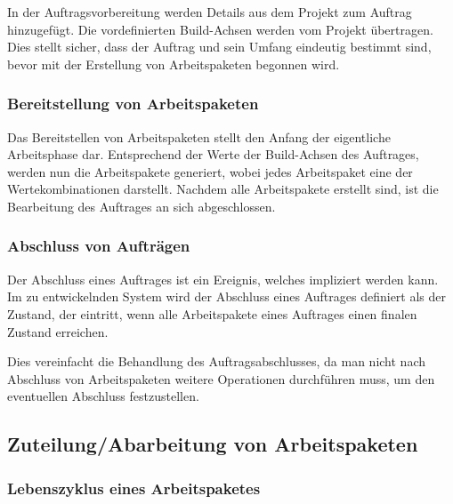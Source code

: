 In der Auftragsvorbereitung werden Details aus dem Projekt zum Auftrag hinzugefügt.
Die vordefinierten Build-Achsen werden vom Projekt übertragen.
Dies stellt sicher, dass der Auftrag und sein Umfang eindeutig bestimmt sind,
bevor mit der Erstellung von Arbeitspaketen begonnen wird.


\subsubsection{Bereitstellung von Arbeitspaketen}

Das Bereitstellen von Arbeitspaketen stellt den Anfang der eigentliche Arbeitsphase dar.
Entsprechend der Werte der Build-Achsen des Auftrages, werden nun die Arbeits\-pakete generiert,
wobei jedes Arbeitspaket eine der Wertekombinationen darstellt.
Nachdem alle Arbeitspakete erstellt sind, ist die Bearbeitung des Auftrages an sich abgeschlossen.

\subsubsection{Abschluss von Aufträgen}

Der Abschluss eines Auftrages ist ein Ereignis, welches impliziert werden kann.
Im zu entwickelnden System wird der Abschluss eines Auftrages definiert
als der Zustand, der eintritt, wenn alle Arbeitspakete eines Auftrages
einen finalen Zustand erreichen.

Dies vereinfacht die Behandlung des Auftragsabschlusses,
da man nicht nach Abschluss von Arbeitspaketen weitere Operationen durchführen muss,
um den eventuellen Abschluss festzustellen.

\subsection{Zuteilung/Abarbeitung von Arbeitspaketen}


\subsubsection{Lebenszyklus eines Arbeitspaketes}


